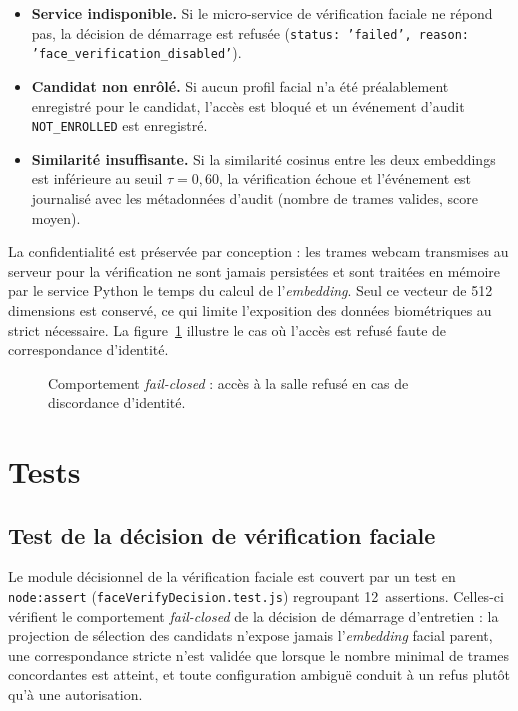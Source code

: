 \begin{itemize}
  \item \textbf{Service indisponible.} Si le micro-service de vérification faciale ne répond
        pas, la décision de démarrage est refusée (\texttt{status: 'failed',
        reason: 'face\_\allowbreak verification\_\allowbreak disabled'}).
  \item \textbf{Candidat non enrôlé.} Si aucun profil facial n'a été préalablement enregistré
        pour le candidat, l'accès est bloqué et un événement d'audit
        \texttt{NOT\_ENROLLED} est enregistré.
  \item \textbf{Similarité insuffisante.} Si la similarité cosinus entre les deux embeddings
        est inférieure au seuil $\tau = 0{,}60$, la vérification échoue et l'événement est journalisé
        avec les métadonnées d'audit (nombre de trames valides, score moyen).
\end{itemize}

La confidentialité est préservée par conception : les trames webcam transmises au serveur
pour la vérification ne sont jamais persistées et sont traitées en mémoire par le service
Python le temps du calcul de l'\textit{embedding}. Seul ce vecteur de 512 dimensions est
conservé, ce qui limite l'exposition des données biométriques au strict nécessaire. La figure~\ref{fig:face-verify-failed} illustre le cas où l'accès est refusé faute de correspondance d'identité.

\begin{figure}[H]
  \centering
  \caption{Comportement \textit{fail-closed} : accès à la salle refusé en cas de discordance d'identité.}
  \label{fig:face-verify-failed}
\end{figure}

\section{Tests}

\subsection{Test de la décision de vérification faciale}

Le module décisionnel de la vérification faciale est couvert par un test en
\texttt{node:assert} (\texttt{faceVerifyDecision.test.js}) regroupant 12~assertions. Celles-ci
vérifient le comportement \textit{fail-closed} de la décision de démarrage d'entretien :
la projection de sélection des candidats n'expose jamais l'\textit{embedding} facial parent,
une correspondance stricte n'est validée que lorsque le nombre minimal de trames concordantes
est atteint, et toute configuration ambiguë conduit à un refus plutôt qu'à une autorisation.

